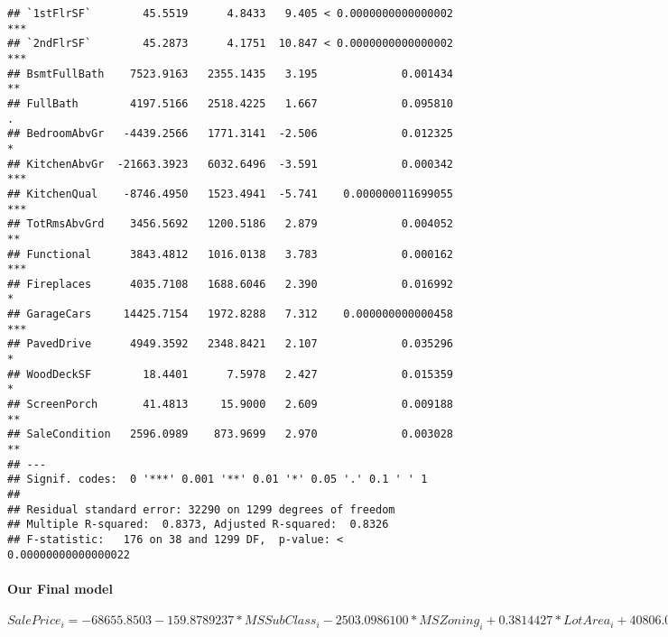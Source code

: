 \documentclass[]{article}
\let\oldparagraph\paragraph
\renewcommand{\paragraph}[1]{\oldparagraph{#1}\mbox{}}
\begin{document}
\begin{verbatim}
## `1stFlrSF`        45.5519      4.8433   9.405 < 0.0000000000000002 ***
## `2ndFlrSF`        45.2873      4.1751  10.847 < 0.0000000000000002 ***
## BsmtFullBath    7523.9163   2355.1435   3.195             0.001434 ** 
## FullBath        4197.5166   2518.4225   1.667             0.095810 .  
## BedroomAbvGr   -4439.2566   1771.3141  -2.506             0.012325 *  
## KitchenAbvGr  -21663.3923   6032.6496  -3.591             0.000342 ***
## KitchenQual    -8746.4950   1523.4941  -5.741    0.000000011699055 ***
## TotRmsAbvGrd    3456.5692   1200.5186   2.879             0.004052 ** 
## Functional      3843.4812   1016.0138   3.783             0.000162 ***
## Fireplaces      4035.7108   1688.6046   2.390             0.016992 *  
## GarageCars     14425.7154   1972.8288   7.312    0.000000000000458 ***
## PavedDrive      4949.3592   2348.8421   2.107             0.035296 *  
## WoodDeckSF        18.4401      7.5978   2.427             0.015359 *  
## ScreenPorch       41.4813     15.9000   2.609             0.009188 ** 
## SaleCondition   2596.0989    873.9699   2.970             0.003028 ** 
## ---
## Signif. codes:  0 '***' 0.001 '**' 0.01 '*' 0.05 '.' 0.1 ' ' 1
## 
## Residual standard error: 32290 on 1299 degrees of freedom
## Multiple R-squared:  0.8373, Adjusted R-squared:  0.8326 
## F-statistic:   176 on 38 and 1299 DF,  p-value: < 0.00000000000000022
\end{verbatim}

\hypertarget{our-final-model}{%
\paragraph{Our Final model}\label{our-final-model}}

\(SalePrice_{i} = -68655.8503 -159.8789237 * MSSubClass_{i}-2503.0986100* MSZoning_{i} + 0.3814427* LotArea_{i} +40806.0476399* Street_{i} -1310.5265783* LotShape_{i} + 3914.9209353*LandContour_{i} +6115.5393877 * LandSlope_{i} -7336.6649714* Condition2_{i} -1224.6139620* HouseStyle_{i} + 12959.5730624 * OverallQual_{i} + 4247.8548222 *OverallCond_{i} + 2632.4405086 *RoofStyle_{i} + 4131.9524015*RoofMatl_{i} -614.3119175 * Exterior1st_{i} + 4335.1775745* MasVnrType_{i} +30.2912* MasVnrArea_{i} -8542.1790* ExterQual_{i} -8542.1790*Foundation_{i} + BsmtQual_{i} + 3202.5638*BsmtCond_{i} -3678.7800* BsmtExposure_{i} -1168.7326* BsmtFinType1_{i} + 5.8341* BsmtFinSF1_{i} + 45.5519*1stFlrSF_{i} + 7523.9163* 2ndFlrSF_{i} + BsmtFullBath_{i} + 4197.5166 * FullBath_{i} -4439.2566*BedroomAbvGr_{i} + 3456.5692*KitchenAbvGr_{i} -8746.4950* KitchenQual_{i} + 3456.5692*TotRmsAbvGrd_{i} + 3843.4812*Functional_{i} + 4035.7108*Fireplaces_{i} + 14425.7154*GarageCars_{i} + 4949.3592*PavedDrive_{i} + 18.4401*WoodDeckSF_{i} + 41.4813 *ScreenPorch_{i} + 2596.0989 * SaleCondition_{i}\)
\end{document}
